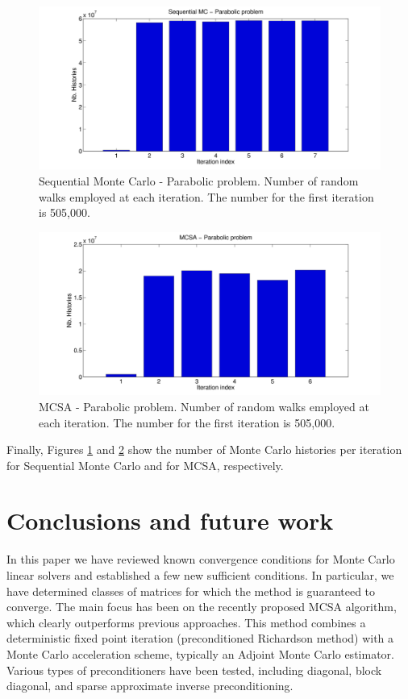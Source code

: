 \documentclass[times]{nlaauth}
\begin{document}
\begin{figure}
  \centering
    \includegraphics[width=\textwidth]{MC_graphs/SEQ_parabolic}
      \caption{Sequential Monte Carlo - Parabolic problem. Number of random
walks
employed at each
iteration. The number for the first iteration is 505,000.}
\label{SEQ_parabolic}
\end{figure}


\begin{figure}
  \centering
    \includegraphics[width=\textwidth]{MC_graphs/MCSA_parabolic}
      \caption{MCSA - Parabolic problem. Number of random walks
employed at each
iteration. The number for the first iteration is 505,000.}
\label{MCSA_parabolic}
\end{figure}

Finally, Figures \ref{SEQ_parabolic} and \ref{MCSA_parabolic}
show the number of Monte Carlo histories per iteration
for Sequential Monte Carlo
and for MCSA, respectively.

\section{Conclusions and future work}
\label{sec:conclusion}

In this paper we have reviewed known convergence conditions for Monte Carlo linear
solvers and established a few new sufficient conditions. In particular, we
have determined classes of matrices for which the method  is guaranteed
to converge. The main focus has
been on the recently proposed MCSA algorithm, which clearly outperforms
previous approaches. This method combines a deterministic fixed point
iteration (preconditioned Richardson method) with a Monte Carlo
acceleration scheme, typically an Adjoint Monte Carlo estimator. Various
types of preconditioners have been tested, including diagonal, block
diagonal, and sparse approximate inverse preconditioning.
\end{document}
